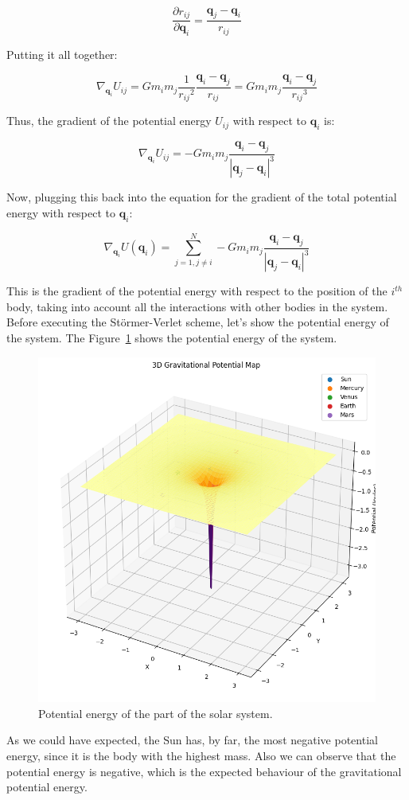\documentclass{report}
\begin{document}
\[ 
	\frac{\partial r_{ij}}{\partial \mathbf{q}_i} = \frac{\mathbf{q}_j - \mathbf{q}_i}{{r_{ij}}} 
\]

Putting it all together:

\[ 
	\nabla_{\mathbf{q}_i} U_{ij} = G m_i m_j \frac{1}{{r_{ij}}^2} \frac{\mathbf{q}_i - \mathbf{q}_j}{{r_{ij}}} = G m_i m_j \frac{\mathbf{q}_i - \mathbf{q}_j}{{r_{ij}}^3} 
\]

Thus, the gradient of the potential energy \(U_{ij}\) with respect to \(\mathbf{q}_i\) is:
		
\[
	\nabla_{\mathbf{q}_i} U_{ij} = - G m_i m_j \frac{\mathbf{q}_i - \mathbf{q}_j}{|\mathbf{q}_j - \mathbf{q}_i|^3}
\]
		
Now, plugging this back into the equation for the gradient of the total potential energy with respect to \(\mathbf{q}_i\):
		
\[
	\nabla_{\mathbf{q}_i} U(\mathbf{q}_i) = \sum_{j=1, j\neq i}^{N} - G m_i m_j \frac{\mathbf{q}_i - \mathbf{q}_j}{|\mathbf{q}_j - \mathbf{q}_i|^3}
\]
		
This is the gradient of the potential energy with respect to the position of the \(i^{th}\) body, taking into account all the interactions with other bodies in the system. Before executing the Störmer-Verlet scheme, let's show the potential energy of the system. The Figure~\ref{fig:potentialenergy} shows the potential energy of the system.

\begin{figure}[H]
	\centering
	\includegraphics[width=0.5\linewidth]{./Figures/SolarSystem/gravitationalpotential.png}
	\caption{Potential energy of the part of the solar system.}
	\label{fig:potentialenergy}
\end{figure}
As we could have expected, the Sun has, by far, the most negative potential energy, since it is the body with the highest mass. Also we can observe that the potential energy is negative, which is the expected behaviour of the gravitational potential energy. 
\end{document}
